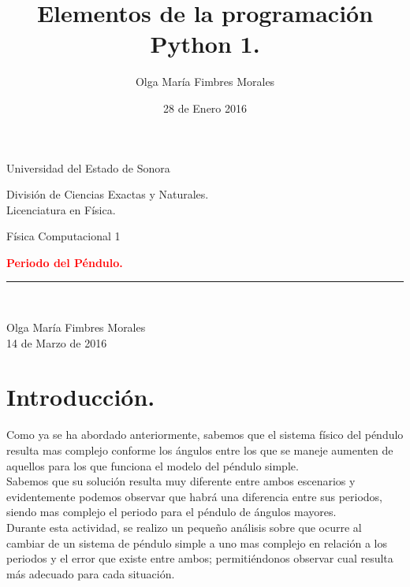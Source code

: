 \documentclass[12pt]{article}
\title{Elementos de la programación Python 1.}
\author{\textcolor{JungleGreen}{Olga María Fimbres Morales}}
\date{28 de Enero 2016}
\begin{document}
\begin{titlepage}

\begin{center}
\begin{large}
Universidad del Estado de Sonora\\
\end{large}
\vspace*{0.15in}
División de Ciencias Exactas y Naturales.\\
\vspace*{0.15in}
Licenciatura en Física. \\
\vspace*{0.6in}
\begin{large}
Física Computacional 1\\
\end{large}
\vspace*{0.2in}
\begin{Large}
\textbf{{\textcolor{Red}{Periodo del Péndulo.}}} \\
\end{Large}


\rule{80mm}{0.1mm}\\
\vspace*{0.1in}
\begin{large}
{\textcolor{JungleGreen}{Olga María Fimbres Morales}}\\
14 de Marzo de 2016\\
\end{large}
\end{center}
\end{titlepage}

\pagebreak
\section*{Introducción.}
 Como ya se ha abordado anteriormente, sabemos que el sistema físico del péndulo resulta mas complejo conforme los ángulos entre los que se maneje aumenten de aquellos para los que funciona el modelo del péndulo simple.\\
 Sabemos que su solución resulta muy diferente entre ambos escenarios y evidentemente podemos observar que habrá una diferencia entre sus periodos, siendo mas complejo el periodo para el péndulo de ángulos mayores.\\
 Durante esta actividad, se realizo un pequeño análisis sobre que ocurre al cambiar de un sistema de péndulo simple a uno mas complejo en relación a los periodos y el error que existe entre ambos; permitiéndonos observar cual resulta más adecuado para cada situación.
 
\end{document}
